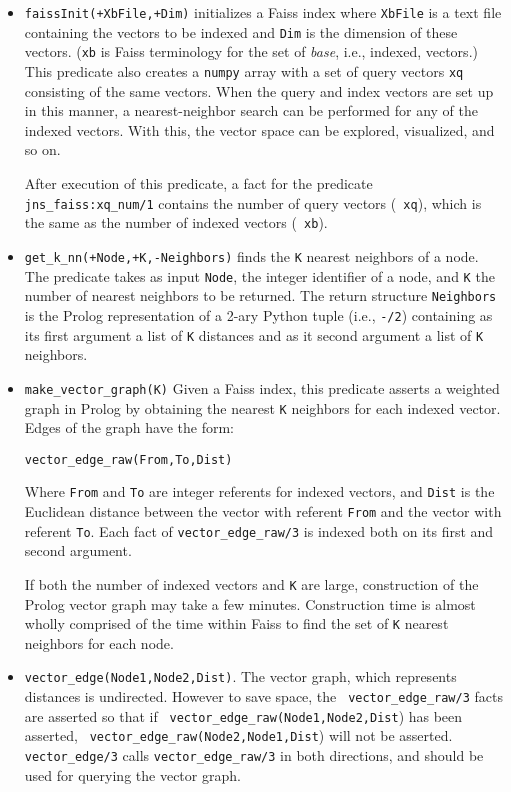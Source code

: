 \begin{itemize}
\item {\tt faissInit(+XbFile,+Dim)} initializes a Faiss index where
  {\tt XbFile} is a text file containing the vectors to be indexed and
  {\tt Dim} is the dimension of these vectors. ({\tt xb} is Faiss
  terminology for the set of {\em base}, i.e., indexed, vectors.)
  This predicate also creates a {\tt numpy} array with a set of query
  vectors {\tt xq} consisting of the same vectors.  When the query and
  index vectors are set up in this manner, a nearest-neighbor search
  can be performed for any of the indexed vectors.  With this, the
  vector space can be explored, visualized, and so on.

  After execution of this predicate, a fact for the predicate {\tt
    jns\_faiss:xq\_num/1} contains the number of query vectors ({\tt
    xq}), which is the same as the number of indexed vectors ({\tt
    xb}).

\item {\tt get\_k\_nn(+Node,+K,-Neighbors)} finds the {\tt K} nearest
  neighbors of a node.  The predicate takes as input {\tt Node}, the
  integer identifier of a node, and {\tt K} the number of nearest
  neighbors to be returned.  The return structure {\tt Neighbors} is
  the Prolog representation of a 2-ary Python tuple (i.e., {\tt -/2})
  containing as its first argument a list of {\tt K} distances and as
  it second argument a list of {\tt K} neighbors.


\item {\tt make\_vector\_graph(K)} Given a Faiss index, this predicate
  asserts a weighted graph in Prolog by obtaining the nearest {\tt K}
  neighbors for each indexed vector.  Edges of the graph have the form:

  {\tt vector\_edge\_raw(From,To,Dist)}

  \noindent
  Where {\tt From} and {\tt To} are integer referents for indexed
  vectors, and {\tt Dist} is the Euclidean distance between the vector
  with referent {\tt From} and the vector with referent {\tt To}.
  Each fact of {\tt vector\_edge\_raw/3} is indexed both on its first
  and second argument.

  If both the number of indexed vectors and {\tt K} are large,
  construction of the Prolog vector graph may take a few minutes.
  Construction time is almost wholly comprised of the time within
  Faiss to find the set of {\tt K} nearest neighbors for each node.

\item {\tt vector\_edge(Node1,Node2,Dist)}.  The vector graph, which
  represents distances is undirected.  However to save space, the {\tt
    vector\_edge\_raw/3} facts are asserted so that if {\tt
    vector\_edge\_raw(Node1,Node2,Dist}) has been asserted, {\tt
    vector\_edge\_raw(Node2,Node1,Dist}) will not be asserted.  {\tt
    vector\_edge/3} calls {\tt vector\_edge\_raw/3} in both
  directions, and should be used for querying the vector graph.
  

\end{itemize}
